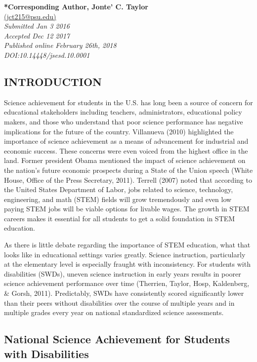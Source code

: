 \documentclass[11.5pt]{sig-alternate} %
\begin{document}

\textbf{*Corresponding Author, Jonte’ C. Taylor}\\
\href{mailto: jct215@psu.edu }{(jct215@psu.edu)} \\
\textit{Submitted Jan 3 2016 }\\
\textit{Accepted Dec 12 2017} \\
\textit{Published online February 26th, 2018} \\
\textit{DOI:10.14448/jsesd.10.0001} \\
\pagebreak
\clearpage
\begin{large}
\section*{INTRODUCTION}
Science achievement for students in the U.S. has long been a source of concern for educational stakeholders including teachers, administrators, educational policy makers, and those who understand that poor science performance has negative implications for the future of the country. Villanueva (2010) highlighted the importance of science achievement as a means of advancement for industrial and economic success.  These concerns were even voiced from the highest office in the land.  Former president Obama mentioned the impact of science achievement on the nation’s future economic prospects during a State of the Union speech (White House, Office of the Press Secretary, 2011).  Terrell (2007) noted that according to the United States Department of Labor, jobs related to science, technology, engineering, and math (STEM) fields will grow tremendously and even low paying STEM jobs will be viable options for livable wages.  The growth in STEM careers makes it essential for all students to get a solid foundation in STEM education.  

As there is little debate regarding the importance of STEM education, what that looks like in educational settings varies greatly.  Science instruction, particularly at the elementary level is especially fraught with inconsistency.  For students with disabilities (SWDs), uneven science instruction in early years results in poorer science achievement performance over time (Therrien, Taylor, Hosp, Kaldenberg, \& Gorsh, 2011).  Predictably, SWDs have consistently scored significantly lower than their peers without disabilities over the course of multiple years and in multiple grades every year on national standardized science assessments.

\subsection*{National Science Achievement for Students with Disabilities}


\end{large}
\end{document}
